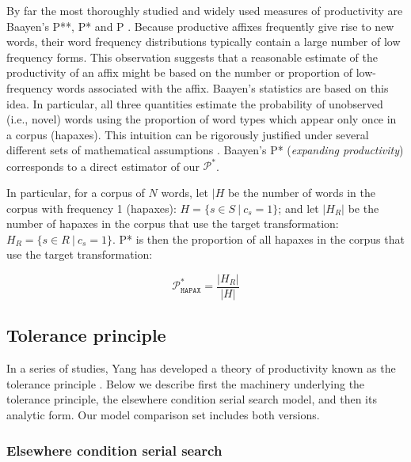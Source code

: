 \documentclass[
   11pt,
       ]{book}
\begin{document}
By far the most thoroughly studied and widely used measures of productivity are
Baayen's P**, P* and P \citep{baayen2001}. Because productive affixes frequently
give rise to new words, their word frequency distributions typically contain a
large number of low frequency forms. This observation suggests that a reasonable
estimate of the productivity of an affix might be based on the number or
proportion of low-frequency words associated with the affix. Baayen's statistics
are based on this idea. In particular, all three quantities estimate the
probability of unobserved (i.e., novel) words using the proportion of word types
which appear only once in a corpus (hapaxes). This intuition can be rigorously
justified under several different sets of mathematical assumptions
\citep{baayen2001}. Baayen's P* (\emph{expanding productivity}) corresponds to a direct
estimator of our \(\mathcal{P}^*\).

In particular, for a corpus of \(N\) words, let \(|H\)\textbar{} be the number of words in
the corpus with frequency 1 (hapaxes): \(H = \{s \in S\ |\ c_s = 1\}\); and let
\(|H_R|\) be the number of hapaxes in the corpus that use the target
transformation: \(H_R = \{s \in R\ |\ c_s = 1\}\). P* is then the proportion of
all hapaxes in the corpus that use the target transformation:

\[ \mathcal{P}^*_\texttt{HAPAX} = \frac{|H_R|}{|H|}\]

\hypertarget{tolerance-principle}{%
\subsection{Tolerance principle}\label{tolerance-principle}}

In a series of studies, Yang has developed a theory of productivity known as the
tolerance principle \citep{yang2005, yang2010, yang2016}. Below we describe first
the machinery underlying the tolerance principle, the elsewhere condition serial
search model, and then its analytic form. Our model comparison set includes both
versions.

\hypertarget{elsewhere-condition-serial-search}{%
\subsubsection{Elsewhere condition serial search}\label{elsewhere-condition-serial-search}}
\end{document}
